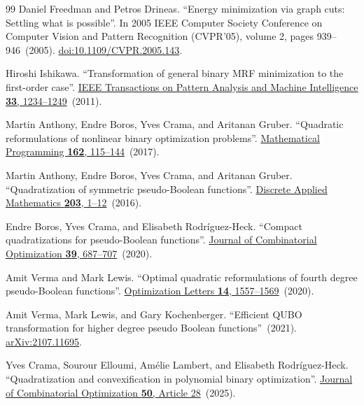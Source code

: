 \documentclass[a4paper,onecolumn,11pt,unpublished]{quantumarticle}
\theoremstyle{remark}
\begin{document}
\begin{thebibliography}{99}
Daniel Freedman and Petros Drineas.
\newblock ``Energy minimization via graph cuts: Settling what is possible''.
\newblock In 2005 IEEE Computer Society Conference on Computer Vision and Pattern Recognition (CVPR'05), volume 2, pages 939--946~(2005).
\newblock \href{https://dx.doi.org/10.1109/CVPR.2005.143}{doi:10.1109/CVPR.2005.143}.

Hiroshi Ishikawa.
\newblock ``Transformation of general binary MRF minimization to the first-order case''.
\newblock \href{https://dx.doi.org/10.1109/TPAMI.2010.91}{IEEE Transactions on Pattern Analysis and Machine Intelligence {\bf 33}, 1234--1249}~(2011).

Martin Anthony, Endre Boros, Yves Crama, and Aritanan Gruber.
\newblock ``Quadratic reformulations of nonlinear binary optimization problems''.
\newblock \href{https://dx.doi.org/10.1007/s10107-016-1032-4}{Mathematical Programming {\bf 162}, 115--144}~(2017).

Martin Anthony, Endre Boros, Yves Crama, and Aritanan Gruber.
\newblock ``Quadratization of symmetric pseudo-Boolean functions''.
\newblock \href{https://doi.org/10.1016/j.dam.2016.01.001}{Discrete Applied Mathematics {\bf 203}, 1--12}~(2016).


Endre Boros, Yves Crama, and Elisabeth Rodr{\'i}guez-Heck.
\newblock ``Compact quadratizations for pseudo-Boolean functions''.
\newblock \href{https://dx.doi.org/10.1007/s10878-019-00511-0}{Journal of Combinatorial Optimization {\bf 39}, 687--707}~(2020).

Amit Verma and Mark Lewis.
\newblock ``Optimal quadratic reformulations of fourth degree pseudo-Boolean functions''.
\newblock \href{https://dx.doi.org/10.1007/s11590-019-01460-7}{Optimization Letters {\bf 14}, 1557--1569}~(2020).

Amit Verma, Mark Lewis, and Gary Kochenberger.
\newblock ``Efficient QUBO transformation for higher degree pseudo Boolean functions''~(2021).
\newblock \href{http://arxiv.org/abs/2107.11695}{arXiv:2107.11695}.

Yves Crama, Sourour Elloumi, Am{\'e}lie Lambert, and Elisabeth Rodr{\'i}guez-Heck.
\newblock ``Quadratization and convexification in polynomial binary optimization''.
\newblock \href{https://dx.doi.org/10.1007/s10878-025-01334-y}{Journal of Combinatorial Optimization {\bf 50}, Article 28}~(2025).


\end{thebibliography}
\end{document}
